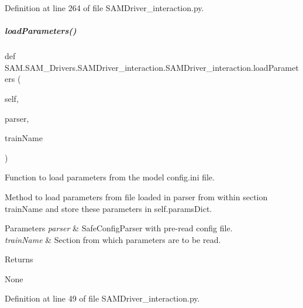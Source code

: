 Definition at line 264 of file S\+A\+M\+Driver\+\_\+interaction.\+py.

\mbox{\label{group__icubclient__SAM__Drivers_a19a7560a34cf400d887b8dfc99c2e666}} 
\subparagraph{\texorpdfstring{load\+Parameters()}{loadParameters()}}
{\footnotesize\ttfamily def S\+A\+M.\+S\+A\+M\+\_\+\+Drivers.\+S\+A\+M\+Driver\+\_\+interaction.\+S\+A\+M\+Driver\+\_\+interaction.\+load\+Parameters (\begin{DoxyParamCaption}\item[{}]{self,  }\item[{}]{parser,  }\item[{}]{train\+Name }\end{DoxyParamCaption})}



Function to load parameters from the model config.\+ini file. 

Method to load parameters from file loaded in parser from within section train\+Name and store these parameters in self.\+params\+Dict.


\begin{DoxyParams}{Parameters}
{\em parser} & Safe\+Config\+Parser with pre-\/read config file. \\
\hline
{\em train\+Name} & Section from which parameters are to be read.\\
\hline
\end{DoxyParams}
\begin{DoxyReturn}{Returns}


None 
\end{DoxyReturn}


Definition at line 49 of file S\+A\+M\+Driver\+\_\+interaction.\+py.

